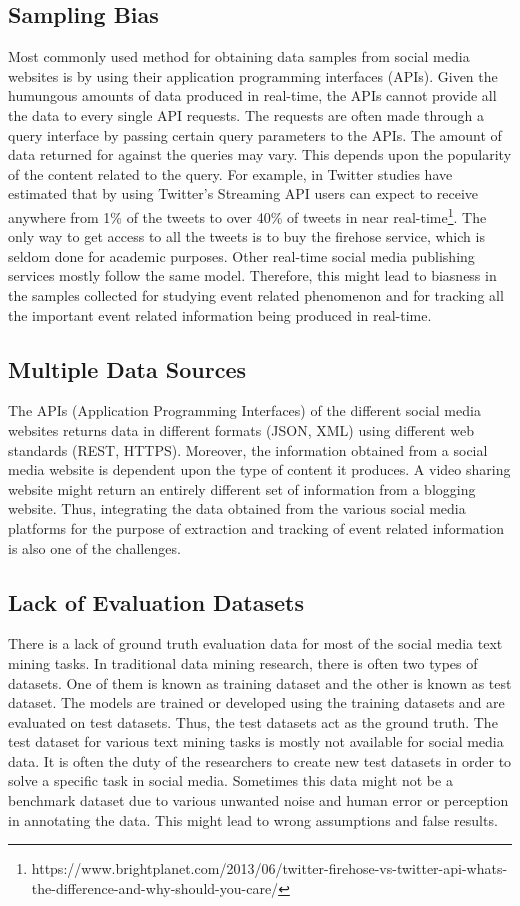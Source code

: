 \subsection{Sampling Bias}
Most commonly used method for obtaining data samples from social media websites is by using their application programming interfaces (APIs). Given the humungous amounts of data produced in real-time, the APIs cannot provide all the data to every single API requests. The requests are often made through a query interface by passing certain query parameters to the APIs. The amount of data returned for against the queries may vary. This depends upon the popularity of the content related to the query. For example, in Twitter studies have estimated that by using Twitter's Streaming API users can expect to receive anywhere from 1\% of the tweets to over 40\% of tweets in near real-time\footnote{https://www.brightplanet.com/2013/06/twitter-firehose-vs-twitter-api-whats-the-difference-and-why-should-you-care/}. The only way to get access to all the tweets is to buy the firehose service, which is seldom done for academic purposes. Other real-time social media publishing services mostly follow the same model. Therefore, this might lead to biasness in the samples collected for studying event related phenomenon and for tracking all the important event related information being produced in real-time.

\subsection{Multiple Data Sources}
The APIs (Application Programming Interfaces) of the different social media websites returns data in different formats (JSON, XML) using different web standards (REST, HTTPS). Moreover, the information obtained from a social media website is dependent upon the type of content it produces. A video sharing website might return an entirely different set of information from a blogging website. Thus, integrating the data obtained from the various social media platforms for the purpose of extraction and tracking of event related information is also one of the challenges.

\subsection{Lack of Evaluation Datasets}
There is a lack of ground truth evaluation data for most of the social media text mining tasks. In traditional data mining research, there is often two types of datasets. One of them is known as training dataset and the other is known as test dataset. The models are trained or developed using the training datasets and are evaluated on test datasets. Thus, the test datasets act as the ground truth. The test dataset for various text mining tasks is mostly not available for social media data. It is often the duty of the researchers to create new test datasets in order to solve a specific task in social media. Sometimes this data might not be a benchmark dataset due to various unwanted noise and human error or perception in annotating the data. This might lead to wrong assumptions and false results.


